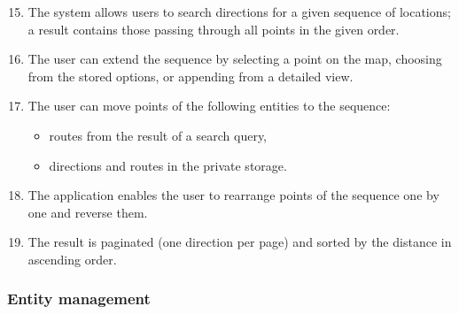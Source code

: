 \begin{enumerate}[label=\textbf{F\arabic*}]\setcounter{enumi}{14}
\item\label{itm:f-search-direcs-search} The system allows users to search directions for a given sequence of locations; a result contains those passing through all points in the given order.
\item\label{itm:f-search-direcs-append} The user can extend the sequence by selecting a point on the map, choosing from the stored options, or appending from a detailed view.
\item\label{itm:f-search-direcs-modify} The user can move points of the following entities to the sequence:
\begin{itemize}
\item routes from the result of a search query,
\item directions and routes in the private storage.
\end{itemize}
\item\label{itm:f-search-direcs-arrange} The application enables the user to rearrange points of the sequence one by one and reverse them.
\item\label{itm:f-search-direcs-list} The result is paginated (one direction per page) and sorted by the distance in ascending order.
\end{enumerate}

\subsubsection*{Entity management}

